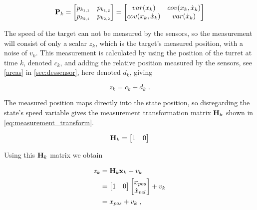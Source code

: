 \begin{equation}
\label{eq:covariance_matrix}
    \mathbf{P}_k =
    \begin{bmatrix}
      p_{k_{1,1}} & p_{k_{1,2}} \\
      p_{k_{2,1}} & p_{k_{2,2}}
    \end{bmatrix}
    =
    \begin{bmatrix}
      var(x_k) & cov(x_k, \dot{x}_k) \\
      cov(x_k, \dot{x}_k) & var(\dot{x}_k)
    \end{bmatrix}
\end{equation}

The speed of the target can not be measured by the sensors, so the measurement will consist of only a scalar $z_k$, which is the target's measured position, with a noise of $v_k$. This measurement is calculated by using the position of the turret at time $k$, denoted $c_k$, and adding the relative position measured by the sensors, see \cref{areas} in \cref{sec:dessensor}, here denoted $d_k$, giving 

\begin{equation}
\label{eq:relative_measurement}
  z_k = c_k+d_k
  \text{ .}
\end{equation}
 
The measured position maps directly into the state position, so disregarding the state's speed variable gives the measurement transformation matrix $\mathbf{H}_k$ shown in \cref{eq:measurement_transform}.

\begin{equation}
\label{eq:measurement_transform}
  \mathbf{H}_k =
     \begin{bmatrix}
      1 & 0 
     \end{bmatrix}
\end{equation}

Using this $\mathbf{H}_k$ matrix we obtain

\begin{equation}
\label{eq:measurement}
\begin{split}
  z_k &= \mathbf{H}_k \mathbf{x}_k + v_k \\
      &=
         \begin{bmatrix}
          1 & 0
         \end{bmatrix}
         \begin{bmatrix}
          x_{pos} \\
          \dot{x}_{vel} 
         \end{bmatrix}
         + v_k \\
     &= x_{pos} + v_k
     \text{ ,}
\end{split}
\end{equation}

